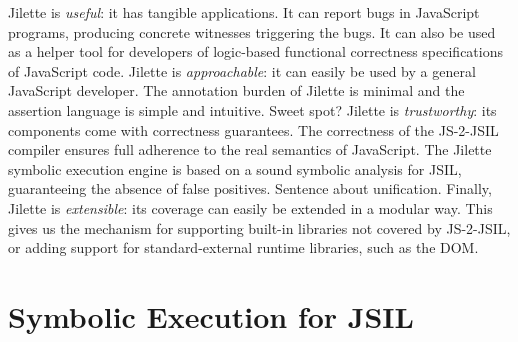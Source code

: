 \documentclass[a4paper,UKenglish]{lipics-v2016}
\newcommand{\jsil}{JSIL\xspace}
\newcommand{\JSComp}{JS-2-JSIL\xspace}
\newcommand{\polish}[1]{{\color{red}#1}}
\newcommand{\jilette}{Jilette\xspace}
\newcommand{\myparagraph}[1]{\smallskip\noindent {\bf #1.}\hspace{1pt}}
\newcommand{\myparagraphq}[1]{\smallskip\noindent {\bf #1?}\hspace{1pt}}
\begin{document}
%
\myparagraphq{Why \jilette} 
\jilette is \emph{useful}: it has tangible applications. 
It can report bugs in JavaScript programs, producing concrete witnesses triggering the bugs. It can also be used as a helper tool for developers of logic-based functional correctness specifications of JavaScript code.
\jilette is \emph{approachable}: it can easily be used by a general JavaScript developer. The annotation burden of \jilette is minimal and the assertion language is simple and intuitive. \polish{Sweet spot?}
\jilette is \emph{trustworthy}: its components come with correctness guarantees. 
The correctness of the \JSComp compiler ensures full adherence to the real semantics of JavaScript. The \jilette symbolic execution engine is based on a sound symbolic
analysis for \jsil, guaranteeing the absence of false positives. \polish{Sentence about unification.}
Finally, \jilette is \emph{extensible}: its coverage can easily be extended in a modular way. This gives us the mechanism for supporting built-in libraries not covered by \JSComp, or adding support for standard-external runtime libraries, such as the DOM.

%
%
%
%




\section{Symbolic Execution for \jsil}\label{sec:jsil:symb:exec}

\end{document}
